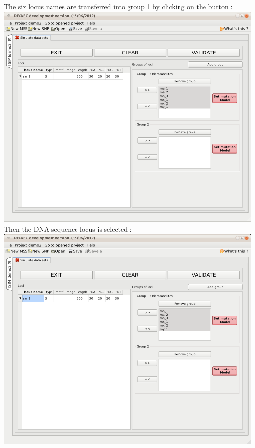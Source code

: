 The six locus names are transferred into group 1 by clicking on the \fbox{\textsf{$>>$}} button :\\

\includegraphics[scale=0.33]{gui_pictures/Capture-DIYABC-77.png} \\

Then the DNA sequence locus is selected :\\

\includegraphics[scale=0.33]{gui_pictures/Capture-DIYABC-78.png} \\


